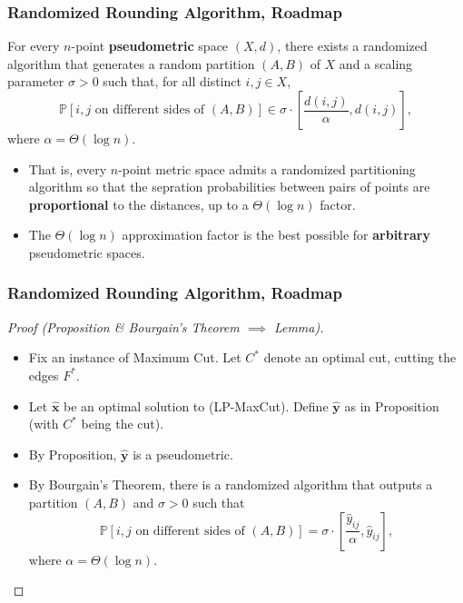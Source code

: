 \documentclass{beamer}
\newcommand{\PP}{\mathbb{P}}
\begin{document}
    \begin{frame}
        \frametitle{Randomized Rounding Algorithm, Roadmap}
    
        \begin{theorem}
            For every $n$-point {\bf pseudometric} space $(X, d)$, there exists a randomized algorithm that generates a random partition $(A, B)$ of $X$ and a scaling parameter $\sigma > 0$ such that, for all distinct $i, j \in X$,
            $$ \PP[\text{$i, j$ on different sides of $(A, B)$}] \in \sigma \cdot \left[\frac{d(i, j)}{\alpha}, d(i, j)\right], $$
            where $\alpha = \Theta(\log n)$.
        \end{theorem}

        \pause

        \begin{itemize}
            \item That is, every $n$-point metric space admits a randomized partitioning algorithm so that the sepration probabilities between pairs of points are {\bf proportional} to the distances, up to a $\Theta(\log n)$ factor. \pause
            \item The $\Theta(\log n)$ approximation factor is the best possible for {\bf arbitrary} pseudometric spaces.
        \end{itemize}
    \end{frame}

    \begin{frame}
        \frametitle{Randomized Rounding Algorithm, Roadmap}
    
        \begin{proof}[Proof (Proposition \& Bourgain's Theorem $\implies$ Lemma)]
            \renewcommand{\qedsymbol}{}
            \begin{itemize}
                \item Fix an instance of {\sc Maximum Cut}. Let $C^*$ denote an optimal cut, cutting the edges $F^*$. \pause
                \item Let $\mathbf{\hat x}$ be an optimal solution to {\sc (LP-MaxCut)}. Define $\mathbf{\hat y}$ as in Proposition (with $C^*$ being the cut). \pause
                \item By Proposition, $\mathbf{\hat y}$ is a pseudometric. \pause
                \item By Bourgain's Theorem, there is a randomized algorithm that outputs a partition $(A, B)$ and $\sigma > 0$ such that
                $$ \PP[\text{$i, j$ on different sides of $(A, B)$}] = \sigma \cdot \left[\frac{\hat y_{ij}}{\alpha}, \hat y_{ij}\right], $$
                where $\alpha = \Theta(\log n)$.
            \end{itemize}
        \end{proof}
    \end{frame}
\end{document}
